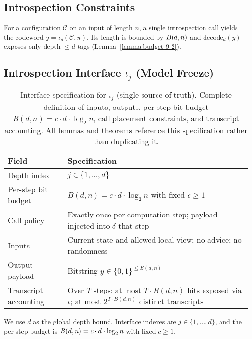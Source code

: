   \subsection{Introspection Constraints}
  
  \begin{definition}
  For a configuration $\mathcal{C}$ on an input of length $n$, a single introspection call yields the codeword $y=\iota_d(\mathcal{C},n)$. Its length is bounded by $\B(d,n)$ and $\mathrm{decode}_d(y)$ exposes only depth-$\le d$ tags (Lemma~\ref{lemma:budget-9-2}).
  \end{definition}
  
\subsection{Introspection Interface \texorpdfstring{$\iota_j$}{iota-j} (Model Freeze)}
\label{sec:model-freeze}
  
  \begin{table}[t]
  \centering
\caption{Interface specification for $\iota_j$ (single source of truth). Complete definition of inputs, outputs, per-step bit budget $B(d,n) = c \cdot d \cdot \log_{2} n$, call placement constraints, and transcript accounting. All lemmas and theorems reference this specification rather than duplicating it.}
  \label{tab:iota-spec}
  \small  %
  \begin{tabular}{@{}p{3.5cm}p{10cm}@{}}  %
  \toprule
  Field & Specification \\
  \midrule
  Depth index & $j \in \{1,\ldots,d\}$ \\
Per-step bit budget & $B(d,n) = c \cdot d \cdot \log_{2} n$ with fixed $c \ge 1$ \\
  Call policy & Exactly once per computation step; payload injected into $\delta$ that step \\
  Inputs & Current state and allowed local view; no advice; no randomness \\
  Output payload & Bitstring $y \in \{0,1\}^{\le B(d,n)}$ \\
  Transcript accounting & Over $T$ steps: at most $T \cdot B(d,n)$ bits exposed via $\iota$; at most $2^{T \cdot B(d,n)}$ distinct transcripts \\
  \bottomrule
  \end{tabular}
\end{table}
  
  \begin{remark}\label{rem:depth-notation}
We use $d$ as the global depth bound. Interface indexes are $j\in\{1,\dots,d\}$, and the per-step budget is $\B(d,n)=c\cdot d\cdot \log_{2} n$ with fixed $c\ge 1$.
  \end{remark}
  
